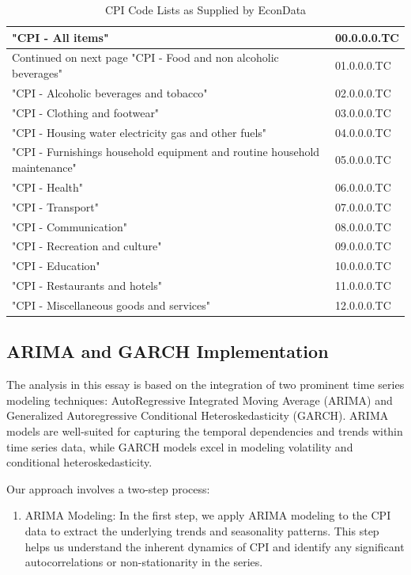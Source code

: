\documentclass[11pt,preprint, authoryear]{elsarticle}
\numberwithin{equation}{section}
\numberwithin{figure}{section}
\numberwithin{table}{section}
\def\tightlist{} %
\begin{document}
\begingroup\fontsize{12pt}{13pt}\selectfont
\begin{longtable}{ll}
\caption{CPI Code Lists as Supplied by EconData 
                \label{tab1}} \\ 
  \toprule
"CPI - All items" & 00.0.0.0.TC \\ 
  \hline 
\endhead 
\hline 
{\footnotesize Continued on next page} 
\endfoot 
\endlastfoot 
 \midrule
"CPI - Food and non alcoholic beverages" & 01.0.0.0.TC \\ 
  "CPI - Alcoholic beverages and tobacco" & 02.0.0.0.TC \\ 
  "CPI - Clothing and footwear" & 03.0.0.0.TC \\ 
  "CPI - Housing water electricity gas and other fuels" & 04.0.0.0.TC \\ 
  "CPI - Furnishings household equipment and routine household maintenance" & 05.0.0.0.TC \\ 
  "CPI - Health" & 06.0.0.0.TC \\ 
  "CPI - Transport" & 07.0.0.0.TC \\ 
  "CPI - Communication" & 08.0.0.0.TC \\ 
  "CPI - Recreation and culture" & 09.0.0.0.TC \\ 
  "CPI - Education" & 10.0.0.0.TC \\ 
  "CPI - Restaurants and hotels" & 11.0.0.0.TC \\ 
  "CPI - Miscellaneous goods and services" & 12.0.0.0.TC \\ 
   \bottomrule
\end{longtable}
\endgroup

\hypertarget{arima-and-garch-implementation}{%
\subsection{ARIMA and GARCH
Implementation}\label{arima-and-garch-implementation}}

The analysis in this essay is based on the integration of two prominent
time series modeling techniques: AutoRegressive Integrated Moving
Average (ARIMA) and Generalized Autoregressive Conditional
Heteroskedasticity (GARCH). ARIMA models are well-suited for capturing
the temporal dependencies and trends within time series data, while
GARCH models excel in modeling volatility and conditional
heteroskedasticity.

Our approach involves a two-step process:

\begin{enumerate}
\def\labelenumi{\arabic{enumi}.}
\tightlist
\item
  ARIMA Modeling: In the first step, we apply ARIMA modeling to the CPI
  data to extract the underlying trends and seasonality patterns. This
  step helps us understand the inherent dynamics of CPI and identify any
  significant autocorrelations or non-stationarity in the series.
\end{enumerate}
\end{document}
